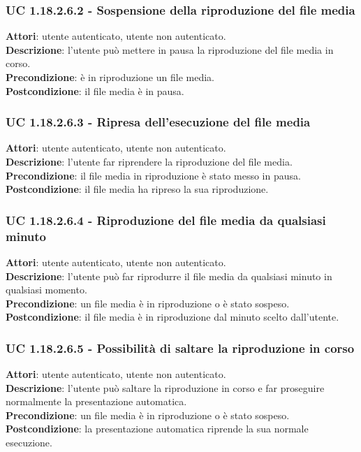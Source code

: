 	\subsubsection{UC 1.18.2.6.2 - Sospensione della riproduzione del file media}{
		\label{uc1.18.2.6.2}
		\textbf{Attori}: utente autenticato, utente non autenticato. \\
		\textbf{Descrizione}: l'utente può mettere in pausa la riproduzione del file media in corso. \\
		\textbf{Precondizione}: è in riproduzione un file media.	\\
		\textbf{Postcondizione}: il file media è in pausa.
	}
	\subsubsection{UC 1.18.2.6.3 - Ripresa dell'esecuzione del file media}{
		\label{uc1.18.2.6.3}
		\textbf{Attori}: utente autenticato, utente non autenticato. \\
		\textbf{Descrizione}: l'utente far riprendere la riproduzione del file media. \\
		\textbf{Precondizione}: il file media in riproduzione è stato messo in pausa.	\\
		\textbf{Postcondizione}: il file media ha ripreso la sua riproduzione.
	}
	\subsubsection{UC 1.18.2.6.4 - Riproduzione del file media da qualsiasi minuto}{
		\label{uc1.18.2.6.4}
		\textbf{Attori}: utente autenticato, utente non autenticato. \\
		\textbf{Descrizione}: l'utente può far riprodurre il file media da qualsiasi minuto in qualsiasi momento. \\
		\textbf{Precondizione}: un file media è in riproduzione o è stato sospeso.	\\
		\textbf{Postcondizione}: il file media è in riproduzione dal minuto scelto dall'utente.
	}
	\subsubsection{UC 1.18.2.6.5 - Possibilità di saltare la riproduzione in corso}{
		\label{uc1.18.2.6.5}
		\textbf{Attori}: utente autenticato, utente non autenticato. \\
		\textbf{Descrizione}: l'utente può saltare la riproduzione in corso e far proseguire normalmente la presentazione automatica. \\
		\textbf{Precondizione}: un file media è in riproduzione o è stato sospeso.	\\
		\textbf{Postcondizione}: la presentazione automatica riprende la sua normale esecuzione.
	}
